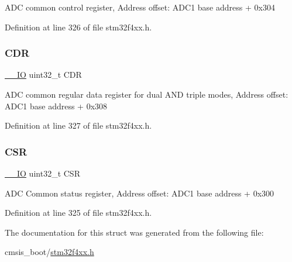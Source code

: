 A\+DC common control register, Address offset\+: A\+D\+C1 base address + 0x304 

Definition at line 326 of file stm32f4xx.\+h.

\mbox{\label{struct_a_d_c___common___type_def_a760f86a1a18dffffda54fc15a977979f}} 
\subsubsection{\texorpdfstring{C\+DR}{CDR}}
{\footnotesize\ttfamily \hyperlink{group___c_m_s_i_s__core__definitions_gaec43007d9998a0a0e01faede4133d6be}{\+\_\+\+\_\+\+IO} uint32\+\_\+t C\+DR}

A\+DC common regular data register for dual A\+ND triple modes, Address offset\+: A\+D\+C1 base address + 0x308 

Definition at line 327 of file stm32f4xx.\+h.

\mbox{\label{struct_a_d_c___common___type_def_a876dd0a8546697065f406b7543e27af2}} 
\subsubsection{\texorpdfstring{C\+SR}{CSR}}
{\footnotesize\ttfamily \hyperlink{group___c_m_s_i_s__core__definitions_gaec43007d9998a0a0e01faede4133d6be}{\+\_\+\+\_\+\+IO} uint32\+\_\+t C\+SR}

A\+DC Common status register, Address offset\+: A\+D\+C1 base address + 0x300 

Definition at line 325 of file stm32f4xx.\+h.



The documentation for this struct was generated from the following file\+:\begin{DoxyCompactItemize}
\item 
cmsis\+\_\+boot/\hyperlink{stm32f4xx_8h}{stm32f4xx.\+h}\end{DoxyCompactItemize}
